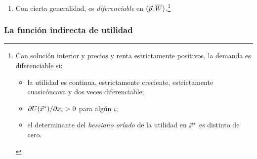 \documentclass[11pt]{article}
\begin{document}
\begin{itemize}
\begin{enumerate}
  \item Con cierta generalidad, es \emph{diferenciable} en $(\vec{p},\overline{W})$.\footnote{Con solución interior y precios y renta estrictamente positivos, la demanda es diferenciable si:
\begin{itemize}
\item la utilidad es continua, estrictamente creciente, estrictamente cuasicóncava y dos veces diferenciable;
\item $\partial U(\vec{x}^*)/\partial x_i>0$ para algún $i$;
\item el determinante del \emph{hessiano orlado} de la utilidad en $\vec{x}^*$ es distinto de cero\nocite{JehleReny2011Advanced}.
\end{itemize}}
  \end{enumerate}
\end{itemize}

\subsubsection{La función indirecta de utilidad}\label{sec:funcion-indirecta-utilidad}
\end{document}
